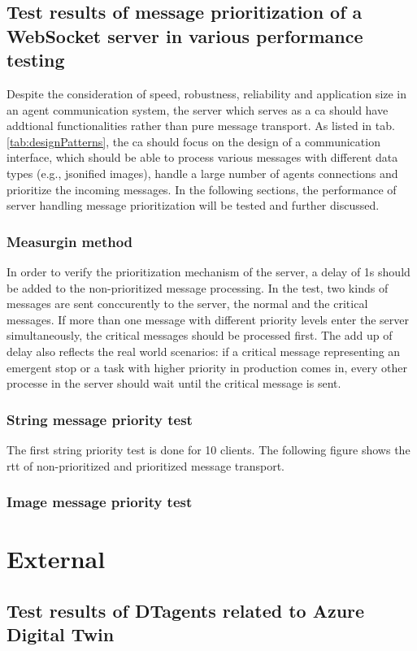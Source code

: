 \subsection{Test results of message prioritization of a WebSocket server in various 
performance testing} \label{chap: Result-priority}
Despite the consideration of speed, robustness, reliability and application size in an agent 
communication system, the server which serves as a \gls{ca} should have addtional 
functionalities rather than pure message transport. As listed in tab.\ref{tab:designPatterns}, 
the \gls{ca} should focus on the design of a communication interface, which should be able to 
process various messages with different data types (e.g., jsonified images), handle a large 
number of agents connections and prioritize the incoming messages. In the following sections, 
the performance of server handling message prioritization will be tested and further discussed.  
\subsubsection{Measurgin method}
In order to verify the prioritization mechanism of the server, a delay of 1s should be added to the 
non-prioritized message processing. In the test, two kinds of messages are sent conccurently to the server, 
the normal and the critical messages. If more than one message with different priority levels 
enter the server simultaneously, the critical messages should be processed first. The add up of 
delay also reflects the real world scenarios: if a critical message representing an emergent stop 
or a task with higher priority in production comes in, every other processe in the server 
should wait until the critical message is sent. 
\subsubsection{String message priority test}
The first string priority test is done for 10 clients. The following figure shows the \gls{rtt} 
of non-prioritized and prioritized message transport. 


\subsubsection{Image message priority test}

\section{External}\label{chap: Result-External}

\subsection{Test results of DTagents related to Azure Digital Twin} \label{chap: Result-DT}